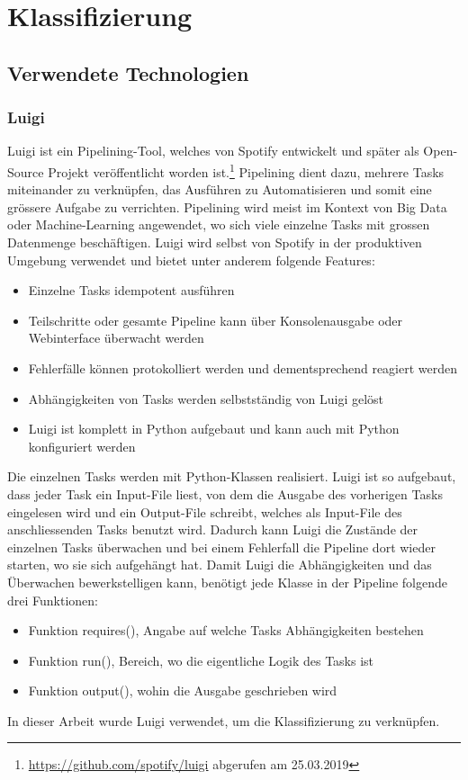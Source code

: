 \section{Klassifizierung}
\subsection{Verwendete Technologien}
\subsubsection{Luigi}
Luigi ist ein Pipelining-Tool, welches von Spotify entwickelt und später als Open-Source Projekt veröffentlicht worden ist.\footnote{\url{https://github.com/spotify/luigi} abgerufen am 25.03.2019}
Pipelining dient dazu, mehrere Tasks miteinander zu verknüpfen, das Ausführen zu Automatisieren und somit eine grössere Aufgabe zu verrichten.
Pipelining wird meist im Kontext von Big Data oder Machine-Learning angewendet, wo sich viele einzelne Tasks mit grossen Datenmenge beschäftigen.
Luigi wird selbst von Spotify in der produktiven Umgebung verwendet und bietet unter anderem folgende Features:
\begin{itemize}
	\item Einzelne Tasks idempotent ausführen
	\item Teilschritte oder gesamte Pipeline kann über Konsolenausgabe oder Webinterface überwacht werden
	\item Fehlerfälle können protokolliert werden und dementsprechend reagiert werden
	\item Abhängigkeiten von Tasks werden selbstständig von Luigi gelöst
	\item Luigi ist komplett in Python aufgebaut und kann auch mit Python konfiguriert werden
\end{itemize}
Die einzelnen Tasks werden mit Python-Klassen realisiert.
Luigi ist so aufgebaut, dass jeder Task ein Input-File liest, von dem die Ausgabe des vorherigen Tasks eingelesen wird und ein Output-File schreibt, welches als Input-File des anschliessenden Tasks benutzt wird.
Dadurch kann Luigi die Zustände der einzelnen Tasks überwachen und bei einem Fehlerfall die Pipeline dort wieder starten, wo sie sich aufgehängt hat.
Damit Luigi die Abhängigkeiten und das Überwachen bewerkstelligen kann, benötigt jede Klasse in der Pipeline folgende drei Funktionen:
\begin{itemize}
	\item Funktion requires(), Angabe auf welche Tasks Abhängigkeiten bestehen
	\item Funktion run(), Bereich, wo die eigentliche Logik des Tasks ist
	\item Funktion output(), wohin die Ausgabe geschrieben wird
\end{itemize}
In dieser Arbeit wurde Luigi verwendet, um die Klassifizierung zu verknüpfen.

